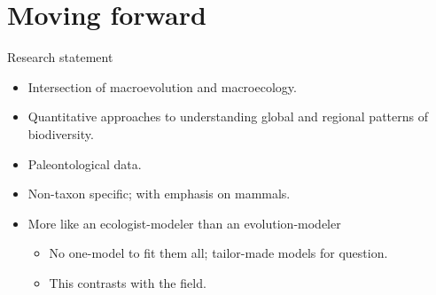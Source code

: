 \documentclass{beamer}
\begin{document}
\section{Moving forward}

\begin{frame}
  \begin{block}{Research statement}
    \begin{itemize}
      \item Intersection of macroevolution and macroecology.
      \item Quantitative approaches to understanding global and regional patterns of biodiversity.
      \item Paleontological data.
      \item Non-taxon specific; with emphasis on mammals.
      \item More like an ecologist-modeler than an evolution-modeler
        \begin{itemize}
          \item No one-model to fit them all; tailor-made models for question.
          \item This contrasts with the field.
        \end{itemize}
    \end{itemize}
  \end{block}
\end{frame}
\end{document}
